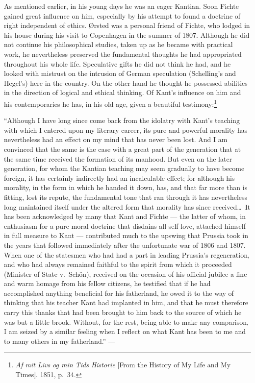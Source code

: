 \documentclass[12pt,a4paper]{book}
\newcommand{\opage}[1]{\marginnote{\footnotesize\textit{[#1]}}}
\begin{document}
As mentioned earlier, in his young days he was an eager Kantian. Soon Fichte gained
great influence on him, especially by his attempt to found a doctrine of right
independent of ethics. Ørsted was a personal friend of Fichte, who lodged \opage{74}in his house
during his visit to Copenhagen in the summer of 1807. Although he did not continue his
philosophical studies, taken up as he became with practical work, he nevertheless
preserved the fundamental thoughts he had appropriated throughout his whole life.
Speculative gifts he did not think he had, and he looked with mistrust on the intrusion
of German speculation (Schelling's and Hegel's) here in the country. On the other hand
he thought he possessed abilities in the direction of logical and ethical thinking. Of
Kant's influence on him and his contemporaries he has, in his old age, given a beautiful
testimony:\footnote{\emph{Af mit Livs og min Tids Historie} [From the History of My Life
and My Times]. 1851, p.~34.}

``Although I have long since come back from the idolatry with Kant's teaching with which
I entered upon my literary career, its pure and powerful morality has nevertheless had
an effect on my mind that has never been lost. And I am convinced that the same is the
case with a great part of the generation that at the same time received the formation of
its manhood. But even on the later generation, for whom the Kantian teaching may seem
gradually to have become foreign, it has certainly indirectly had an incalculable
effect; for although his morality, in the form in which he handed it down, has, and that
far more than is fitting, lost its repute, the fundamental tone that ran through it has
nevertheless long maintained itself under the altered form that morality has since
received\ldots\ It has been acknowledged by many that Kant and Fichte --- the latter of
whom, in enthusiasm for a pure moral doctrine that disdains all self-love, attached
himself in full measure to Kant --- contributed much to the upswing that Prussia took in
the years that followed immediately after the unfortunate war of 1806 and 1807. When one
of the statesmen who had had a part in leading Prussia's regeneration, and who had always
remained faithful to the spirit from which it proceeded (Minister of State v.\ Schön),
received on the occasion of his official jubilee a fine and warm homage from his fellow
citizens, he testified that if he had accomplished anything beneficial for his
fatherland, he owed it to the way of thinking that his teacher Kant had implanted in him,
\opage{75}and that he must therefore carry this thanks that had been brought to him back to the
source of which he was but a little brook. Without, for the rest, being able to make any
comparison, I am seized by a similar feeling when I reflect on what Kant has been to me
and to many others in my fatherland.'' ---
\end{document}
